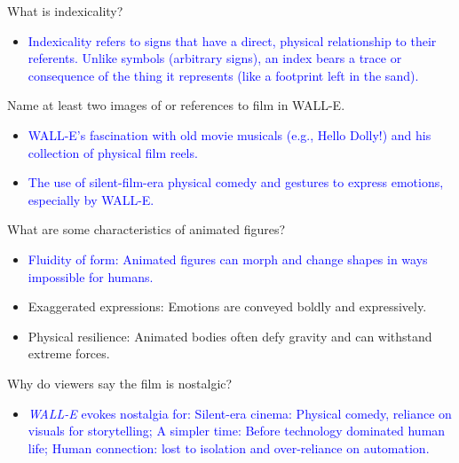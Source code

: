 \documentclass[11pt,fleqn]{book} %
\begin{document}
\begin{exercise}
What is indexicality?
\begin{itemize}
\item \textcolor{blue}{Indexicality refers to signs that have a direct, physical relationship to their referents. Unlike symbols (arbitrary signs), an index bears a trace or consequence of the thing it represents (like a footprint left in the sand).}
\end{itemize}
\end{exercise}

\begin{exercise}
Name at least two images of or references to film in WALL-E.
\begin{itemize}
\item \textcolor{blue}{WALL-E's fascination with old movie musicals (e.g., Hello Dolly!) and his collection of physical film reels.}
\item \textcolor{blue}{The use of silent-film-era physical comedy and gestures to express  emotions, especially by WALL-E.}
\end{itemize}
\end{exercise}

\begin{exercise}
What are some characteristics of animated figures?
\begin{itemize}
\item \textcolor{blue}{Fluidity of form: Animated figures can morph and change shapes in ways impossible for humans.}
\item Exaggerated expressions: Emotions are conveyed boldly and expressively.
\item Physical resilience: Animated bodies often defy gravity and can withstand extreme forces.
\end{itemize}

\end{exercise}

\begin{exercise}
Why do viewers say the film is nostalgic?
\begin{itemize}
 \item \textcolor{blue}{ \textit{WALL-E} evokes nostalgia for:
Silent-era cinema: Physical comedy, reliance on visuals for storytelling; A simpler time:  Before technology dominated human life; Human connection: lost to isolation and over-reliance on automation.}
\end{itemize}
\end{exercise}
\end{document}
